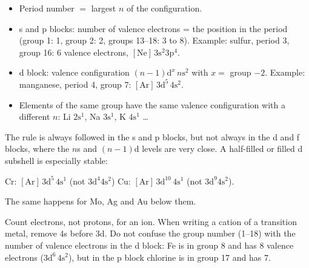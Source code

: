 \begin{itemize}
  \item Period number $=$ largest $n$ of the configuration.
  \item s and p blocks: number of valence electrons = the position in the period (group 1: 1, group 2:
        2, groups 13--18: 3 to 8). Example: sulfur, period 3, group 16: 6 valence electrons,
        $[\mathrm{Ne}]\,3\mathrm s^2 3\mathrm p^4$.
  \item d block: valence configuration $(n-1)\mathrm d^{x}\,n\mathrm s^2$ with $x = $ group $- 2$.
        Example: manganese, period 4, group 7: $[\mathrm{Ar}]\,3\mathrm d^5\,4\mathrm s^2$.
  \item Elements of the same group have the same valence configuration with a different $n$:
        Li $2\mathrm s^1$, Na $3\mathrm s^1$, K $4\mathrm s^1$ \dots
\end{itemize}
\begin{concept}
The rule is always followed in the s and p blocks, but not always in the d and f blocks, where the $n$s
and $(n-1)$d levels are very close. A half-filled or filled d subshell is especially stable:
\begin{center}
Cr: $[\mathrm{Ar}]\,3\mathrm d^5\,4\mathrm s^1$ (not $3\mathrm d^4 4\mathrm s^2$)\qquad
Cu: $[\mathrm{Ar}]\,3\mathrm d^{10}\,4\mathrm s^1$ (not $3\mathrm d^9 4\mathrm s^2$).
\end{center}
The same happens for Mo, Ag and Au below them.
\end{concept}
\begin{trap}
Count electrons, not protons, for an ion. When writing a cation of a transition metal, remove 4s
before 3d. Do not confuse the group number (1--18) with the number of valence electrons in the d block:
Fe is in group 8 and has 8 valence electrons ($3\mathrm d^6\,4\mathrm s^2$), but in the p block chlorine
is in group 17 and has 7.
\end{trap}

